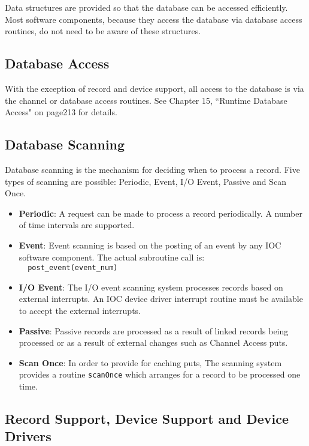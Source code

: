 Data structures are provided so that the database can be accessed efficiently. Most software components, because they 
access the database via database access routines, do not need to be aware of these structures.

\subsection{Database Access}

With the exception of record and device support, all access to the database is via the channel or database access routines. 
See Chapter 15, ``Runtime Database Access" on page213 for details.

\subsection{Database Scanning}

Database scanning is the mechanism for deciding when to process a record. Five types of scanning are possible: Periodic, 
Event, I/O Event, Passive and Scan Once.

\begin{itemize}
\item \textbf{\textbf{Periodic}}:  A request can be made to process a record periodically. A number of time intervals are supported.

\item \textbf{\textbf{Event}}:  Event scanning is based on the posting of an event by any IOC software component. The actual subroutine 
call is: \\
\verb|  post_event(event_num)| 
\item \textbf{\textbf{I/O Event}}:  The I/O event scanning system processes records based on external interrupts. An IOC device driver 
interrupt routine must be available to accept the external interrupts.

\item \textbf{\textbf{Passive}}:  Passive records are processed as a result of linked records being processed or as a result of external 
changes such as Channel Access puts.

\item \textbf{\textbf{Scan Once}}: In order to provide for caching puts, The scanning system provides a routine \verb|scanOnce| which 
arranges for a record to be processed one time.

\end{itemize}\subsection{Record Support, Device Support and Device Drivers}

